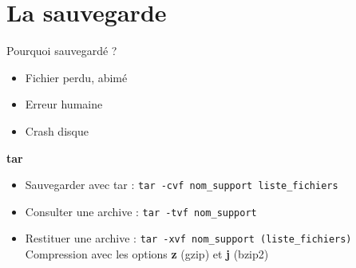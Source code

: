 \documentclass[french]{beamer}
\begin{document}
%
%










\section{La sauvegarde}
\frame{\tableofcontents[current]}

\begin{frame}
Pourquoi sauvegardé ?
\begin{itemize}
\item Fichier perdu, abimé
\item Erreur humaine
\item Crash disque
\end{itemize}
\end{frame}

\begin{frame}
\textbf{tar}
\begin{itemize}
\item Sauvegarder avec tar : \texttt{tar -cvf nom\_support liste\_fichiers}
\item Consulter une archive : \texttt{tar -tvf  nom\_support}
\item Restituer une archive : \texttt{tar -xvf nom\_support (liste\_fichiers)}
\\
Compression avec les options \textbf{z} (gzip) et \textbf{j} (bzip2) \\
\end{itemize}
\end{frame}
\end{document}
